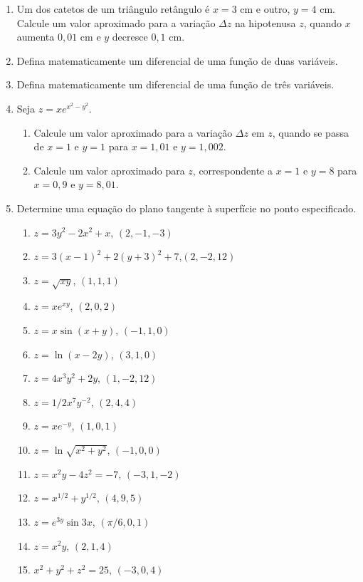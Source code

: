 \documentclass[11pt,a4paper]{article}
\begin{document}
\begin{enumerate}
	\item Um dos catetos de um triângulo retângulo é $x = 3$ cm e outro, $y = 4$ cm. Calcule um valor aproximado para a variação $\Delta z$ na hipotenusa $z$, quando $x$ aumenta $0,01$ cm e $y$ decresce $0,1$ cm. 
	
	\item Defina matematicamente um diferencial de uma função de duas variáveis.
	
	\item Defina matematicamente um diferencial de uma função de três variáveis.
	
	\item Seja $z = xe^{x^2 - y^2}$.
	
	\begin{enumerate}
		\item Calcule um valor aproximado para a variação $\Delta z$ em $z$, quando se passa de $x = 1$ e $y = 1$ para $x = 1,01$ e $y = 1,002$.
		
		\item Calcule um valor aproximado para $z$, correspondente a $x = 1$ e $y = 8$ para $x = 0,9$ e $y = 8,01$.
		
	\end{enumerate}
	
	\item Determine uma equação do plano tangente à superfície no ponto especificado.
	\begin{enumerate}
		\item $z = 3y^2 - 2x^2 + x$, \quad $(2, -1, -3)$
		\item $z = 3(x - 1)^2 + 2(y + 3)^2 + 7$,\quad $(2, -2, 12)$
		\item $z = \sqrt{xy} $, \quad $(1, 1, 1)$
		\item $z = xe^{xy} $, \quad $(2, 0, 2)$
		\item $z = x\sin (x + y) $, \quad $(-1, 1, 0)$
		\item $z = \ln (x - 2y)$, \quad $(3, 1, 0)$
		\item $z = 4x^3y^2 + 2y$, \quad $(1, -2, 12)$
		\item $z = 1/2 x^7y^{-2}$, \quad $(2, 4, 4)$
		\item $z = xe^{-y}$, \quad $(1, 0, 1)$
		
		\item $z = \ln \sqrt{x^2 + y^2}$, \quad $(-1, 0, 0)$
		\item $z = x^2y - 4z^2 = -7$, \quad $(-3, 1, -2)$
		\item $z = x^{1/2} + y^{1/2}$, \quad $(4, 9, 5)$
		\item $z = e^{3y}\sin 3x$, \quad $(\pi /6, 0, 1)$
		\item $z = x^2y$, \quad $(2, 1, 4)$
		\item $x^2 + y^2 + z^2 = 25$, \quad $(-3, 0, 4)$
	\end{enumerate}
	

\end{enumerate}
\end{document}
